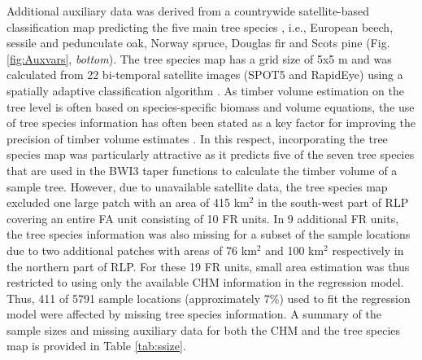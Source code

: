 Additional auxiliary data was derived from a countrywide satellite-based classification map predicting the five main tree species \citep{stoffels2015}, i.e., European beech, sessile and pedunculate oak, Norway spruce, Douglas fir and Scots pine (Fig. \ref{fig:Auxvars}, \textit{bottom}). The tree species map has a grid size of 5x5 m and was calculated from 22 bi-temporal satellite images (SPOT5 and RapidEye) using a spatially adaptive classification algorithm \citep{stoffels2012}. As timber volume estimation on the tree level is often based on species-specific biomass and volume equations, the use of tree species information has often been stated as a key factor for improving the precision of timber volume estimates \citep{white2016}. In this respect, incorporating the tree species map was particularly attractive as it predicts five of the seven tree species that are used in the BWI3 taper functions \citep{kublin2013} to calculate the timber volume of a sample tree. However, due to unavailable satellite data, the tree species map excluded one large patch with an area of 415 km$^2$ in the south-west part of RLP covering an entire FA unit consisting of 10 FR units. In 9 additional FR units, the tree species information was also missing for a subset of the sample locations due to two additional patches with areas of 76 km$^2$ and 100 km$^2$ respectively in the northern part of RLP. For these 19 FR units, small area estimation was thus restricted to using only the available CHM information in the regression model. Thus, 411 of 5791 sample locations (approximately 7\%) used to fit the regression model were affected by missing tree species information. A summary of the sample sizes and missing auxiliary data for both the CHM and the tree species map is provided in Table \ref{tab:ssize}.

